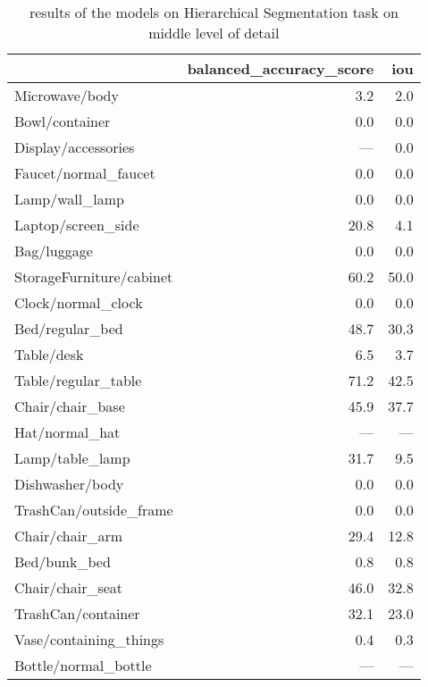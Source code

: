 \begin{table}[!htb]
\caption{results of the models on Hierarchical Segmentation task on middle level of detail}
\begin{tabular}{lrr}
\toprule
{} &  balanced\_accuracy\_score &  iou \\
\midrule
Microwave/body           &                      3.2 &  2.0 \\
Bowl/container           &                      0.0 &  0.0 \\
Display/accessories      &                      --- &  0.0 \\
Faucet/normal\_faucet     &                      0.0 &  0.0 \\
Lamp/wall\_lamp           &                      0.0 &  0.0 \\
Laptop/screen\_side       &                     20.8 &  4.1 \\
Bag/luggage              &                      0.0 &  0.0 \\
StorageFurniture/cabinet &                     60.2 & 50.0 \\
Clock/normal\_clock       &                      0.0 &  0.0 \\
Bed/regular\_bed          &                     48.7 & 30.3 \\
Table/desk               &                      6.5 &  3.7 \\
Table/regular\_table      &                     71.2 & 42.5 \\
Chair/chair\_base         &                     45.9 & 37.7 \\
Hat/normal\_hat           &                      --- &  --- \\
Lamp/table\_lamp          &                     31.7 &  9.5 \\
Dishwasher/body          &                      0.0 &  0.0 \\
TrashCan/outside\_frame   &                      0.0 &  0.0 \\
Chair/chair\_arm          &                     29.4 & 12.8 \\
Bed/bunk\_bed             &                      0.8 &  0.8 \\
Chair/chair\_seat         &                     46.0 & 32.8 \\
TrashCan/container       &                     32.1 & 23.0 \\
Vase/containing\_things   &                      0.4 &  0.3 \\
Bottle/normal\_bottle     &                      --- &  --- \\

\end{tabular}
\end{table}
